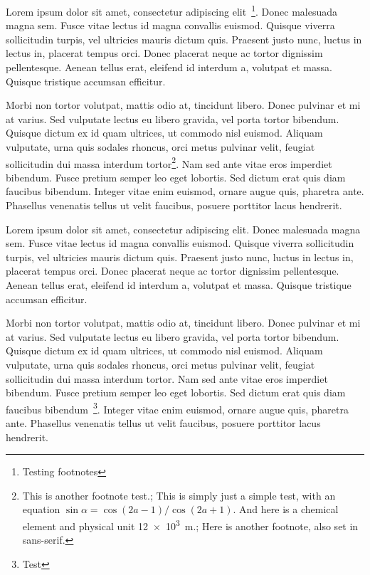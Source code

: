 Lorem ipsum dolor sit amet, consectetur adipiscing elit~\cite{feynman,statistics}\footnote{Testing footnotes}.
Donec malesuada magna sem.
Fusce vitae lectus id magna convallis euismod.
Quisque viverra sollicitudin turpis, vel ultricies mauris dictum quis.
Praesent justo nunc, luctus in lectus in, placerat tempus orci.
Donec placerat neque ac tortor dignissim pellentesque.
Aenean tellus erat, eleifend id interdum a, volutpat et massa.
Quisque tristique accumsan efficitur.

Morbi non tortor volutpat, mattis odio at, tincidunt libero.
Donec pulvinar et mi at varius.
Sed vulputate lectus eu libero gravida, vel porta tortor bibendum.
Quisque dictum ex id quam ultrices, ut commodo nisl euismod.
Aliquam vulputate, urna quis sodales rhoncus, orci metus pulvinar velit, feugiat sollicitudin dui massa interdum tortor\footnote{This is another footnote test.; This is simply just a simple test, with an equation $\sin \alpha = \cos(2a-1)/\cos(2a+1)$. And here is a chemical element  and physical unit \SI{12e3}{m}.; Here is another footnote, also set in sans-serif.}.
Nam sed ante vitae eros imperdiet bibendum. 
Fusce pretium semper leo eget lobortis.
Sed dictum erat quis diam faucibus bibendum.
Integer vitae enim euismod, ornare augue quis, pharetra ante.
Phasellus venenatis tellus ut velit faucibus, posuere porttitor lacus hendrerit.

Lorem ipsum dolor sit amet, consectetur adipiscing elit.
Donec malesuada magna sem.
Fusce vitae lectus id magna convallis euismod.
Quisque viverra sollicitudin turpis, vel ultricies mauris dictum quis.
Praesent justo nunc, luctus in lectus in, placerat tempus orci.
Donec placerat neque ac tortor dignissim pellentesque.
Aenean tellus erat, eleifend id interdum a, volutpat et massa.
Quisque tristique accumsan efficitur.

Morbi non tortor volutpat, mattis odio at, tincidunt libero.
Donec pulvinar et mi at varius.
Sed vulputate lectus eu libero gravida, vel porta tortor bibendum.
Quisque dictum ex id quam ultrices, ut commodo nisl euismod.
Aliquam vulputate, urna quis sodales rhoncus, orci metus pulvinar velit, feugiat sollicitudin dui massa interdum tortor.
Nam sed ante vitae eros imperdiet bibendum.
Fusce pretium semper leo eget lobortis.
Sed dictum erat quis diam faucibus bibendum~\cite{particle}\footnote{Test}.
Integer vitae enim euismod, ornare augue quis, pharetra ante.
Phasellus venenatis tellus ut velit faucibus, posuere porttitor lacus hendrerit.


